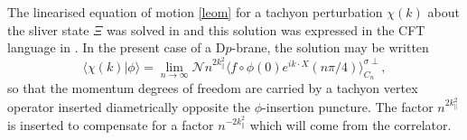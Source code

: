 \documentclass[letterpaper,12pt]{article}
\def\Pcm#1{{\mathcal{#1}}}
\begin{document}
The linearised equation of motion \eqref{leom} for a tachyon perturbation $\chi(k)$
about the sliver state $\Xi$ was solved in \cite{HK} and this
solution was expressed in the CFT language in \cite{RSZ6}. In the present case of
a D$p$-brane, the solution may be written
\begin{equation}
\label{chi}
\big\langle \chi(k) \big| \phi \big\rangle = \lim_{n \rightarrow \infty} 
                       \Pcm{N}n^{2k_\parallel^2}\big\langle f \circ \phi(0) e^{ik\cdot X}(n\pi/4)\big\rangle^{\sigma \perp}_{C_n}
,\end{equation}
so that the momentum degrees of freedom are carried by a tachyon vertex operator inserted 
diametrically opposite the $\phi$-insertion puncture. The factor $n^{2k_\parallel^2}$ is inserted to 
compensate for a factor $n^{-2k_\parallel^2}$ which will come from the correlator.
\end{document}
